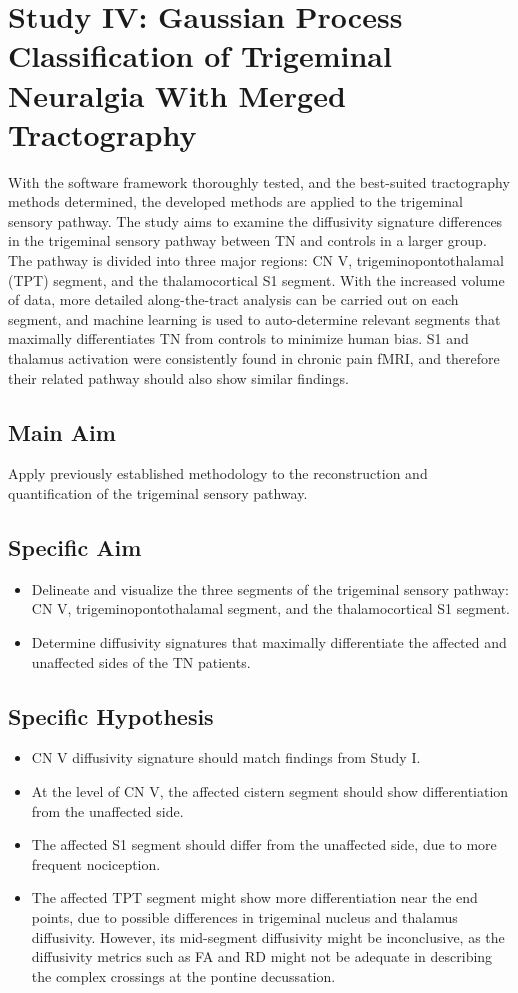 \section{Study IV: Gaussian Process Classification of Trigeminal Neuralgia With Merged Tractography}
With the software framework thoroughly tested, and the best-suited tractography methods determined, the developed methods are applied to the trigeminal sensory pathway. The study aims to examine the diffusivity signature differences in the trigeminal sensory pathway between TN and controls in a larger group. The pathway is divided into three major regions: CN V, trigeminopontothalamal (TPT) segment, and the thalamocortical S1 segment. With the increased volume of data, more detailed along-the-tract analysis can be carried out on each segment, and machine learning is used to auto-determine relevant segments that maximally differentiates TN from controls to minimize human bias. S1 and thalamus activation were consistently found in chronic pain fMRI, and therefore their related pathway should also show similar findings. 

\subsection{Main Aim}
Apply previously established methodology to the reconstruction and quantification of the trigeminal sensory pathway. 

\subsection{Specific Aim}
\begin{itemize}
    \item Delineate and visualize the three segments of the trigeminal sensory pathway: CN V, trigeminopontothalamal segment, and the thalamocortical S1 segment. 
    \item Determine diffusivity signatures that maximally differentiate the affected and unaffected sides of the TN patients.
\end{itemize}

\subsection{Specific Hypothesis}
\begin{itemize}
    \item CN V diffusivity signature should match findings from Study I.
    \item At the level of CN V, the affected cistern segment should show differentiation from the unaffected side.
    \item The affected S1 segment should differ from the unaffected side, due to more frequent nociception.
    \item The affected TPT segment might show more differentiation near the end points, due to possible differences in trigeminal nucleus and thalamus diffusivity. However, its mid-segment diffusivity might be inconclusive, as the diffusivity metrics such as FA and RD might not be adequate in describing the complex crossings at the pontine decussation. 
\end{itemize}
